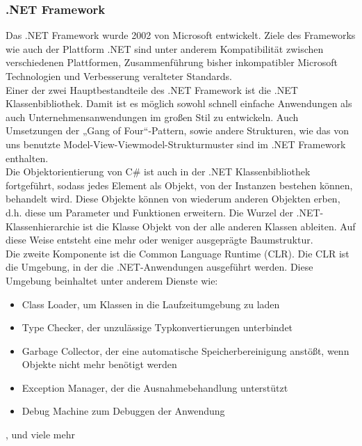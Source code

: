 \documentclass[12pt,a4paper,headinclude,twoside, plainheadsepline, open=right,numbers=noenddot]{scrreprt}
\begin{document}
\subsubsection{.NET Framework} 
Das .NET Framework wurde 2002 von Microsoft entwickelt. Ziele des Frameworks wie auch der Plattform .NET sind unter anderem Kompatibilität zwischen verschiedenen Plattformen, Zusammenführung bisher inkompatibler Microsoft Technologien und Verbesserung veralteter Standards. \cite{DotNet}
\\
Einer der zwei Hauptbestandteile des .NET Framework ist die .NET Klassenbibliothek. Damit ist es möglich sowohl schnell einfache Anwendungen als auch Unternehmensanwendungen im großen Stil zu entwickeln. Auch Umsetzungen der „Gang of Four“-Pattern, sowie andere Strukturen, wie das von uns benutzte Model-View-Viewmodel-Strukturmuster sind im .NET Framework enthalten.  \\

Die Objektorientierung von C\# ist auch in der .NET Klassenbibliothek fortgeführt, sodass jedes Element als Objekt, von der Instanzen bestehen können, behandelt wird. Diese Objekte können von wiederum anderen Objekten erben, d.h. diese um Parameter und Funktionen erweitern. Die Wurzel der .NET-Klassenhierarchie ist die Klasse Objekt von der alle anderen Klassen ableiten. Auf diese Weise entsteht eine mehr oder weniger ausgeprägte Baumstruktur\cite{Kühnel}. \\

Die zweite Komponente ist die Common Language Runtime (CLR). Die CLR ist die Umgebung, in der die .NET-Anwendungen ausgeführt werden. Diese Umgebung beinhaltet unter anderem Dienste wie:
\begin{itemize}
\item Class Loader, um Klassen in die Laufzeitumgebung zu laden
\item Type Checker, der unzulässige Typkonvertierungen unterbindet
\item Garbage Collector, der eine  automatische Speicherbereinigung anstößt, wenn Objekte nicht mehr benötigt werden
\item Exception Manager, der die Ausnahmebehandlung unterstützt
\item Debug Machine zum Debuggen der Anwendung
\end{itemize}
, und viele mehr \cite{Kühnel}
\end{document}
